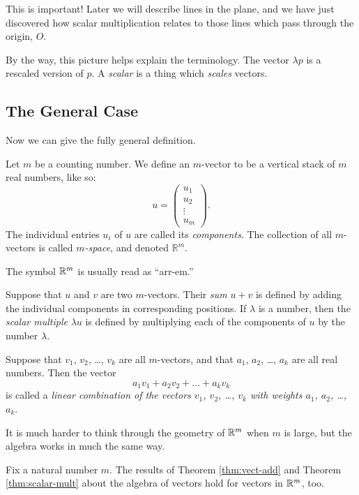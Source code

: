 \documentclass[elementsmain.tex]{subfiles}
\begin{document}
This is important! Later we will describe lines in the plane, and we have just discovered how scalar multiplication relates to those lines which pass through the origin, $O$.

By the way, this picture helps explain the terminology. The vector $\lambda p$ is a rescaled version of $p$. A \emph{scalar} is a thing which \emph{scales} vectors.

\subsection*{The General Case}

Now we can give the fully general definition.

\begin{definition}
Let $m$ be a counting number. We define an $m$-vector to be a vertical stack of $m$ real numbers, like so:
\[
u = \begin{pmatrix} u_1 \\ u_2 \\ \vdots \\ u_m \end{pmatrix} .
\]
The individual entries $u_i$ of $u$ are called its \emph{components}.
The collection of all $m$-vectors is called \emph{$m$-space}, and denoted $\mathbb{R}^m$.
\end{definition}

The symbol $\mathbb{R}^m$ is usually read as ``arr-em.''


\begin{definition}
Suppose that $u$ and $v$ are two $m$-vectors. Their \emph{sum} $u+v$ is defined by adding the individual components in corresponding positions. If $\lambda$ is a number, then the \emph{scalar multiple} $\lambda u$ is defined by multiplying each of the components of $u$ by the number $\lambda$.

Suppose that $v_1$, $v_2$, \dots, $v_k$ are all $m$-vectors, and that $a_1$, $a_2$, \dots, $a_k$ are all real numbers. Then the vector 
\[
a_1 v_1 + a_2 v_2 + \dots + a_k v_k
\]
is called a \emph{linear combination of the vectors $v_1$, $v_2$, \dots, $v_k$ with weights  $a_1$, $a_2$, \dots, $a_k$}.
\end{definition}

It is much harder to think through the geometry of $\mathbb{R}^m$ when $m$ is large, but the algebra works in much the same way.

\begin{theorem} Fix a natural number $m$. The results of Theorem \ref{thm:vect-add} and Theorem \ref{thm:scalar-mult} about the algebra of vectors hold for vectors in $\mathbb{R}^m$, too.
\end{theorem}
\end{document}

